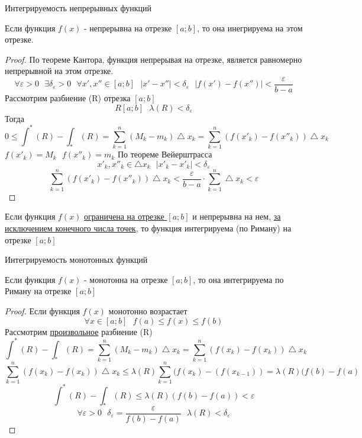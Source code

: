 \begin{title}
  Интегрируемость непрерывных функций
\end{title}

\begin{theorem}[1]
  Если функция $f(x)$ - непрерывна на отрезке $[a; b]$, то она инегрируема на
  этом отрезке.
\end{theorem}

\begin{proof}
  По теореме Кантора, функция непрерывая на отрезке, является равномерно
  непрерывной на этом отрезке.
  \[\forall \varepsilon > 0 ~~~ \exists \delta_\varepsilon > 0 ~~~ \forall
    x', x'' \in [a; b] ~~~ |x' - x''| < \delta_\varepsilon ~~~
    |f(x') - f(x'')| < \frac{\varepsilon}{b - a}\]
  Рассмотрим разбиение (R) отрезка $[a; b]$
  \[R [a; b] ~~~ \lambda (R) < \delta_\varepsilon\]
  Тогда
  \[0 \le \int^* (R) - \int_* (R) = \sum_{k = 1}^{n} (M_k - m_k)
    \bigtriangleup x_k = \sum_{k = 1}^{n} (f(x'_k) - f(x''_k))
    \bigtriangleup x_k\]
  $f(x'_k) = M_k ~~~ f(x''_k) = m_k$
  По теореме Вейерштрасса
  \[x'_k, x''_k \in \bigtriangleup x_k ~~~ |x'_k - x'_k| < \delta_\varepsilon\]
  \[\sum_{k = 1}^{n} (f(x'_k) - f(x''_k)) \bigtriangleup x_k <
    \frac{\varepsilon}{b - a} \cdot \sum_{k = 1}^{n} \bigtriangleup x_k <
    \varepsilon\]
\end{proof}

\begin{theorem}[2]
  Если функция $f(x)$ \underline{ограничена на отрезке $[a; b]$} и непрерывна
  на нем, \underline{за исключением конечного числа точек}, то функция
  интегрируема (по Риману) на отрезке $[a; b]$
\end{theorem}

\begin{title}
  Интегрируемость монотонных функций
\end{title}

\begin{theorem}
  Если функция $f(x)$ - монотонна на отрезке $[a; b]$, то она интегрируема по
  Риману на отрезке $[a; b]$
\end{theorem}

\begin{proof}
  Если функция $f(x)$ монотонно возрастает
  \[\forall x \in [a; b] ~~~ f(a) \le f(x) \le f(b)\]
  Рассмотрим \underline{произвольное} разбиение (R)
  \[\int^* (R) - \int_* (R) = \sum_{k = 1}^{n} (M_k - m_k) \bigtriangleup x_k
    = \sum_{k = 1}^{n} (f(x_k) - f(x_k)) \bigtriangleup x_k\]
  \[\sum_{k = 1}^{n} (f(x_k) - f(x_k)) \bigtriangleup x_k \le \lambda(R)
    \sum_{k = 1}^{n} (f(x_k) - (f(x_{k - 1})) = \lambda (R) (f(b) - f(a)\]
  \[\int^* (R) - \int_* (R) \le \lambda (R) (f(b) - f(a)) < \varepsilon\]
  \[\forall \varepsilon > 0 ~~~ \delta_\varepsilon = \frac{\varepsilon}{f(b) -
    f(a)} ~~~ \lambda (R) < \delta_\varepsilon\]
\end{proof}